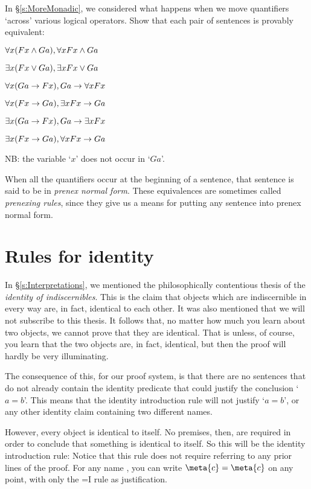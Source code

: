 \problempart
In \S\ref{s:MoreMonadic}, we considered what happens when we move quantifiers `across' various logical operators. Show that each pair of sentences is provably equivalent:
\begin{earg}
\item $\forall x (Fx \wedge Ga), \forall x Fx \wedge Ga$
\item $\exists x (Fx \vee Ga), \exists x Fx \vee Ga$
\item $\forall x(Ga \rightarrow Fx), Ga \rightarrow \forall x Fx$
\item $\forall x(Fx \rightarrow Ga), \exists x Fx \rightarrow Ga$
\item $\exists x(Ga \rightarrow Fx), Ga \rightarrow \exists x Fx$
\item $\exists x(Fx \rightarrow Ga), \forall x Fx \rightarrow Ga$
\end{earg}
NB: the variable `$x$' does not occur in `$Ga$'.

When all the quantifiers occur at the beginning of a sentence, that sentence is said to be in \emph{prenex normal form}. These equivalences are sometimes called \emph{prenexing rules}, since they give us a means for putting any sentence into prenex normal form.


\chapter{Rules for identity}
In \S\ref{s:Interpretations}, we mentioned the philosophically contentious thesis of the \emph{identity of indiscernibles}. This is the claim that objects which are indiscernible in every way are, in fact, identical to each other. It was also mentioned that we will not subscribe to this thesis. It follows that, no matter how much you learn about two objects, we cannot prove that they are identical. That is unless, of course, you learn that the two objects are, in fact, identical, but then the proof will hardly be very illuminating.

The consequence of this, for our proof system, is that there are no sentences that do not already contain the identity predicate that could justify the conclusion `$a=b$'. This means that the identity introduction rule will not justify `$a=b$', or any other identity claim containing two different names.

However, every object is identical to itself. No premises, then, are required in order to conclude that something is identical to itself. So this will be the identity introduction rule:
Notice that this rule does not require referring to any prior lines of the proof. For any name , you can write $\meta{c}=\meta{c}$ on any point, with only the {=}I rule as justification. 

